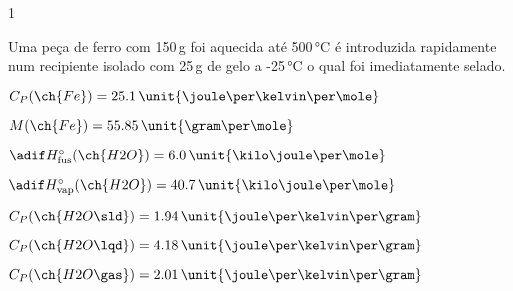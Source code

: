 \begin{questionBox}1{}
    
    Uma peça de ferro com 150\,\unit{\gram} foi aquecida até 500\,\unit{\celsius} é introduzida rapidamente num recipiente isolado com 25\,\unit{\gram} de gelo a -25\,\unit{\celsius} o qual foi imediatamente selado.

    \begin{itemize}
        \begin{multicols}{2}
            \item \(C_P(\ch{Fe}) = 25.1\,\unit{\joule\per\kelvin\per\mole}\)
            \item \(M  (\ch{Fe}) = 55.85\,\unit{\gram\per\mole}\)
            \item \(\adif H^{\circ}_{\text{fus}} (\ch{H2O}) =  6.0\,\unit{\kilo\joule\per\mole}\)
            \item \(\adif H^{\circ}_{\text{vap}} (\ch{H2O}) = 40.7\,\unit{\kilo\joule\per\mole}\)
            \item \(C_P(\ch{H2O\sld}) = 1.94\,\unit{\joule\per\kelvin\per\gram}\)
            \item \(C_P(\ch{H2O\lqd}) = 4.18\,\unit{\joule\per\kelvin\per\gram}\)
            \item \(C_P(\ch{H2O\gas}) = 2.01\,\unit{\joule\per\kelvin\per\gram}\)
        \end{multicols}
    \end{itemize}


\end{questionBox}
